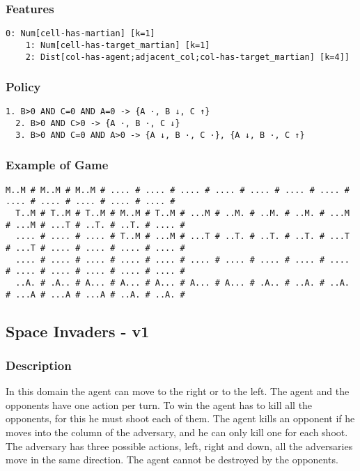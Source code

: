 \documentclass[a4paper]{article}
\begin{document}
\subsubsection{Features}
\begin{Verbatim}[fontsize=\footnotesize]
  0: Num[cell-has-martian] [k=1]
	1: Num[cell-has-target_martian] [k=1]
	2: Dist[col-has-agent;adjacent_col;col-has-target_martian] [k=4]]
\end{Verbatim}

\subsubsection{Policy}
\begin{Verbatim}[fontsize=\footnotesize]
  1. B>0 AND C=0 AND A=0 -> {A ·, B ↓, C ↑}
  2. B>0 AND C>0 -> {A ·, B ·, C ↓}
  3. B>0 AND C=0 AND A>0 -> {A ↓, B ·, C ·}, {A ↓, B ·, C ↑}
\end{Verbatim}

\subsubsection{Example of Game}
\begin{Verbatim}[fontsize=\footnotesize]
  M..M # M..M # M..M # .... # .... # .... # .... # .... # .... # .... # .... # .... # .... # .... # .... #
  T..M # T..M # T..M # M..M # T..M # ...M # ..M. # ..M. # ..M. # ...M # ...M # ...T # ..T. # ..T. # .... #
  .... # .... # .... # T..M # ...M # ...T # ..T. # ..T. # ..T. # ...T # ...T # .... # .... # .... # .... #
  .... # .... # .... # .... # .... # .... # .... # .... # .... # .... # .... # .... # .... # .... # .... #
  ..A. # .A.. # A... # A... # A... # A... # A... # .A.. # ..A. # ..A. # ...A # ...A # ...A # ..A. # ..A. #
\end{Verbatim}

\subsection{Space Invaders - v1}
\subsubsection{Description}
In this domain the agent can move to the right or to the left. The agent and the opponents have one action per turn. To win the agent has to kill all the opponents, for this he must shoot each of them. The agent kills an opponent if he moves into the column of the adversary, and he can only kill one for each shoot. The adversary has three possible actions, left, right and down, all the adversaries move in the same direction. The agent cannot be destroyed by the opponents.
\end{document}
